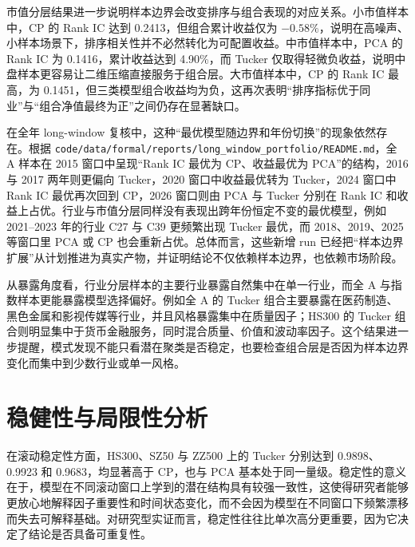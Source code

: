 市值分层结果进一步说明样本边界会改变排序与组合表现的对应关系。小市值样本中，CP 的 Rank IC 达到 0.2413，但组合累计收益仅为 $-0.58\%$，说明在高噪声、小样本场景下，排序相关性并不必然转化为可配置收益。中市值样本中，PCA 的 Rank IC 为 0.1416，累计收益达到 4.90\%，而 Tucker 仅取得轻微负收益，说明中盘样本更容易让二维压缩直接服务于组合层。大市值样本中，CP 的 Rank IC 最高，为 0.1451，但三类模型组合收益均为负，这再次表明“排序指标优于同业”与“组合净值最终为正”之间仍存在显著缺口。

在全年 long-window 复核中，这种“最优模型随边界和年份切换”的现象依然存在。根据 \texttt{code/data/formal/reports/long\_window\_portfolio/README.md}，全 A 样本在 2015 窗口中呈现“Rank IC 最优为 CP、收益最优为 PCA”的结构，2016 与 2017 两年则更偏向 Tucker，2020 窗口中收益最优转为 Tucker，2024 窗口中 Rank IC 最优再次回到 CP，2026 窗口则由 PCA 与 Tucker 分别在 Rank IC 和收益上占优。行业与市值分层同样没有表现出跨年份恒定不变的最优模型，例如 2021--2023 年的行业 C27 与 C39 更频繁出现 Tucker 最优，而 2018、2019、2025 等窗口里 PCA 或 CP 也会重新占优。总体而言，这些新增 run 已经把“样本边界扩展”从计划推进为真实产物，并证明结论不仅依赖样本边界，也依赖市场阶段。

从暴露角度看，行业分层样本的主要行业暴露自然集中在单一行业，而全 A 与指数样本更能暴露模型选择偏好。例如全 A 的 Tucker 组合主要暴露在医药制造、黑色金属和影视传媒等行业，并且风格暴露集中在质量因子；HS300 的 Tucker 组合则明显集中于货币金融服务，同时混合质量、价值和波动率因子。这个结果进一步提醒，模式发现不能只看潜在聚类是否稳定，也要检查组合层是否因为样本边界变化而集中到少数行业或单一风格。

\section{稳健性与局限性分析}

在滚动稳定性方面，HS300、SZ50 与 ZZ500 上的 Tucker 分别达到 0.9898、0.9923 和 0.9683，均显著高于 CP，也与 PCA 基本处于同一量级。稳定性的意义在于，模型在不同滚动窗口上学到的潜在结构具有较强一致性，这使得研究者能够更放心地解释因子重要性和时间状态变化，而不会因为模型在不同窗口下频繁漂移而失去可解释基础。对研究型实证而言，稳定性往往比单次高分更重要，因为它决定了结论是否具备可重复性。

